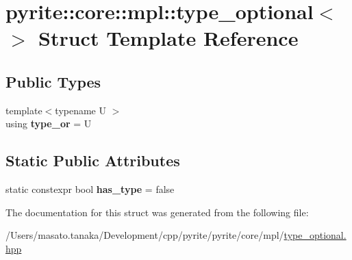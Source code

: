 \hypertarget{structpyrite_1_1core_1_1mpl_1_1type__optional_3_4}{}\section{pyrite\+:\+:core\+:\+:mpl\+:\+:type\+\_\+optional$<$$>$ Struct Template Reference}
\label{structpyrite_1_1core_1_1mpl_1_1type__optional_3_4}
\subsection*{Public Types}
\begin{DoxyCompactItemize}
\item 
\mbox{\label{structpyrite_1_1core_1_1mpl_1_1type__optional_3_4_a5297b69b30a8b7bfb8547c8105cae8b0}} 
{\footnotesize template$<$typename U $>$ }\\using {\bfseries type\+\_\+or} = U
\end{DoxyCompactItemize}
\subsection*{Static Public Attributes}
\begin{DoxyCompactItemize}
\item 
\mbox{\label{structpyrite_1_1core_1_1mpl_1_1type__optional_3_4_a7d70f466faf93364ff1b7e0e0657d99a}} 
static constexpr bool {\bfseries has\+\_\+type} = false
\end{DoxyCompactItemize}


The documentation for this struct was generated from the following file\+:\begin{DoxyCompactItemize}
\item 
/\+Users/masato.\+tanaka/\+Development/cpp/pyrite/pyrite/core/mpl/\mbox{\hyperlink{core_2mpl_2type__optional_8hpp}{type\+\_\+optional.\+hpp}}\end{DoxyCompactItemize}
